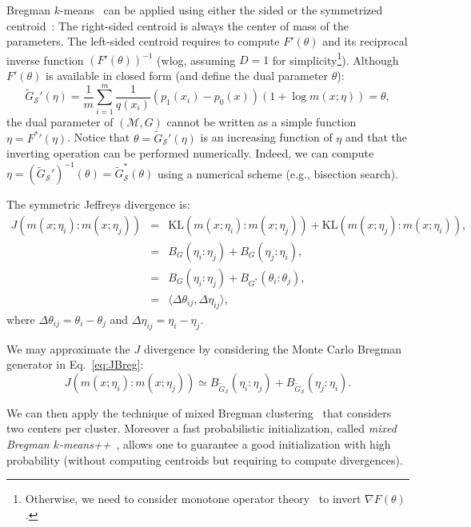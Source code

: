 \documentclass[graybox]{svmult}
\def\inner#1#2{{\langle #1,#2\rangle}}
\def\KL{\mathrm{KL}}
\def\tildeG{\tilde{G}}
\def\calS{\mathcal{S}}
\def\calM{\mathcal{M}}
\begin{document}
 
Bregman $k$-means~\cite{Bregman-2005,Fast1DClustering-2017} can be
applied using either the sided or the symmetrized centroid~\cite{SymBregman-2009}:
The right-sided centroid is always the center of mass of the parameters.
The left-sided centroid requires to compute $F'(\theta)$ and its reciprocal inverse function $(F'(\theta))^{-1}$ (wlog, assuming $D=1$ for simplicity\footnote{Otherwise, we need to consider monotone operator theory~\cite{SymbolicMonotoneOp-2017} to invert $\nabla F(\theta)$.}).
Although $F'(\theta)$ is available in closed form (and define the dual parameter $\theta$):
\begin{equation}
\tildeG_\calS'(\eta) = \frac{1}{m} \sum_{i=1}^m  \frac{1}{q(x_i)}  \left(p_1(x_i)-p_0(x)\right) \left(1+\log m(x;\eta)\right) =\theta,
\end{equation}
the dual parameter of $(\calM,G)$ cannot be written as a simple function $\eta={F^*}'(\eta)$.
Notice that $\theta=\tildeG_\calS'(\eta)$ is an increasing function of
$\eta$ and that the inverting operation can be performed numerically.
Indeed, we can compute $\eta=(\tildeG_\calS')^{-1}(\theta)=\tildeG_\calS^*(\theta)$ using a numerical scheme (e.g., bisection search).

                                                  
The symmetric Jeffreys divergence is:
\begin{eqnarray}
J(m(x;\eta_i):m(x;\eta_j)) &=& \KL(m(x;\eta_i):m(x;\eta_j))+\KL(m(x;\eta_j):m(x;\eta_i)),\\
&=& B_G(\eta_i:\eta_j)+B_G(\eta_j:\eta_i),\label{eq:JBreg}\\
&=& B_G(\eta_i:\eta_j)+B_{G^*}(\theta_i:\theta_j),\\
&=&\inner{\Delta\theta_{ij}}{\Delta\eta_{ij}},
\end{eqnarray}
where $\Delta\theta_{ij}=\theta_i-\theta_j$ and $\Delta\eta_{ij}=\eta_i-\eta_j$.



We may approximate the $J$ divergence by considering the Monte Carlo Bregman generator in Eq.~\ref{eq:JBreg}:
\begin{equation}
J(m(x;\eta_i):m(x;\eta_j)) \simeq B_{\tildeG_\calS}(\eta_i:\eta_j)+B_{\tildeG_\calS}(\eta_j:\eta_i).
\end{equation}
 
We can then apply the technique of mixed Bregman clustering~\cite{MixedBregmanClustering-2008} that considers two centers per cluster.
Moreover a fast probabilistic initialization, called {\em mixed Bregman $k$-means++}~\cite{MixedBregmanClustering-2008}, allows one to guarantee a good initialization with high probability (without computing centroids but requiring to compute divergences).
\end{document}
